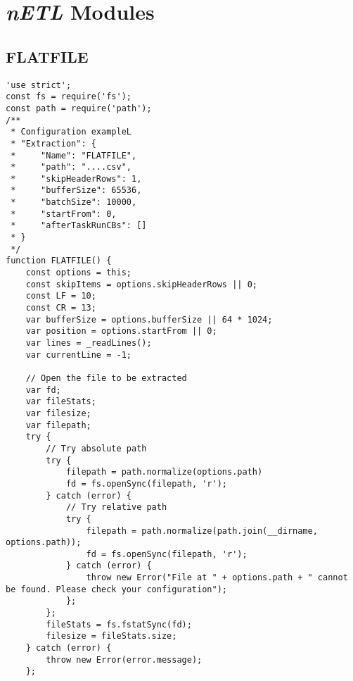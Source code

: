 \section{\textit{nETL} Modules}
\label{appendix:netl-modules}

\subsection{FLATFILE}
\label{netl-extract-flatfile}
\begin{verbatim}
'use strict';
const fs = require('fs');
const path = require('path');
/**
 * Configuration exampleL
 * "Extraction": {
 *     "Name": "FLATFILE",
 *     "path": "....csv",
 *     "skipHeaderRows": 1,
 *     "bufferSize": 65536,
 *     "batchSize": 10000,
 *     "startFrom": 0,
 *     "afterTaskRunCBs": []
 * }
 */
function FLATFILE() {
    const options = this;
    const skipItems = options.skipHeaderRows || 0;
    const LF = 10;
    const CR = 13;
    var bufferSize = options.bufferSize || 64 * 1024;
    var position = options.startFrom || 0;
    var lines = _readLines();
    var currentLine = -1;

    // Open the file to be extracted
    var fd;
    var fileStats;
    var filesize;
    var filepath;
    try {
        // Try absolute path
        try {
            filepath = path.normalize(options.path)
            fd = fs.openSync(filepath, 'r');
        } catch (error) {
            // Try relative path
            try {
                filepath = path.normalize(path.join(__dirname, options.path));
                fd = fs.openSync(filepath, 'r');
            } catch (error) {
                throw new Error("File at " + options.path + " cannot be found. Please check your configuration");
            };
        };
        fileStats = fs.fstatSync(fd);
        filesize = fileStats.size;
    } catch (error) {
        throw new Error(error.message);
    };


\end{verbatim}
